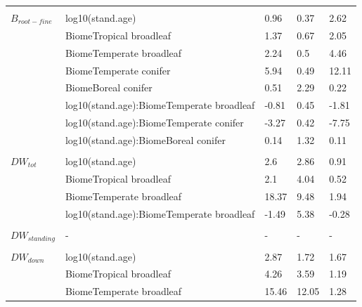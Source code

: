 \documentclass[
]{article}
\begin{document}
\begin{longtable}{lllll}
\addlinespace[1em]
\multicolumn{4}{l}{\textbf{}}\\
\hspace{1em}$B_{root-fine}$ & log10(stand.age) & 0.96 & 0.37 & 2.62\\
\hspace{1em} & BiomeTropical broadleaf & 1.37 & 0.67 & 2.05\\
\hspace{1em} & BiomeTemperate broadleaf & 2.24 & 0.5 & 4.46\\
\hspace{1em} & BiomeTemperate conifer & 5.94 & 0.49 & 12.11\\
\hspace{1em} & BiomeBoreal conifer & 0.51 & 2.29 & 0.22\\
\hspace{1em} & log10(stand.age):BiomeTemperate broadleaf & -0.81 & 0.45 & -1.81\\
\hspace{1em} & log10(stand.age):BiomeTemperate conifer & -3.27 & 0.42 & -7.75\\
\hspace{1em} & log10(stand.age):BiomeBoreal conifer & 0.14 & 1.32 & 0.11\\
\addlinespace[1em]
\multicolumn{4}{l}{\textbf{}}\\
\hspace{1em}$DW_{tot}$ & log10(stand.age) & 2.6 & 2.86 & 0.91\\
\hspace{1em} & BiomeTropical broadleaf & 2.1 & 4.04 & 0.52\\
\hspace{1em} & BiomeTemperate broadleaf & 18.37 & 9.48 & 1.94\\
\hspace{1em} & log10(stand.age):BiomeTemperate broadleaf & -1.49 & 5.38 & -0.28\\
\addlinespace[1em]
\multicolumn{4}{l}{\textbf{}}\\
\hspace{1em}$DW_{standing}$ & - & - & - & -\\
\addlinespace[1em]
\multicolumn{4}{l}{\textbf{}}\\
\hspace{1em}$DW_{down}$ & log10(stand.age) & 2.87 & 1.72 & 1.67\\
\hspace{1em} & BiomeTropical broadleaf & 4.26 & 3.59 & 1.19\\
\hspace{1em} & BiomeTemperate broadleaf & 15.46 & 12.05 & 1.28\\

\end{longtable}
\end{document}
